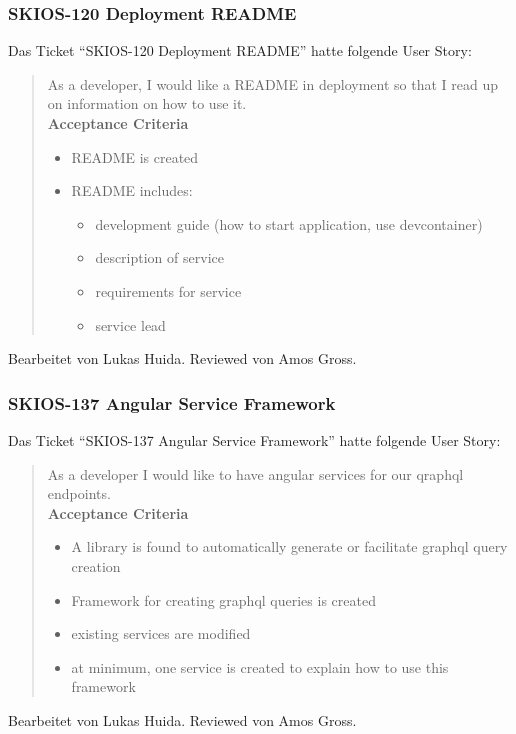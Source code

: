 \subsubsection{SKIOS-120 Deployment README}
Das Ticket \enquote{SKIOS-120 Deployment README} hatte folgende User Story:
\begin{quotation}
    As a developer, I would like a README in deployment so that I read up on information on how to use it. \\
\textbf{Acceptance Criteria}
\begin{itemize}
    \item README is created
    \item README includes:
    \begin{itemize}
        \item development guide (how to start application, use devcontainer)
        \item description of service
        \item requirements for service
        \item service lead
    \end{itemize}
\end{itemize}
\end{quotation}
Bearbeitet von Lukas Huida.
Reviewed von Amos Gross.

\subsubsection{SKIOS-137 Angular Service Framework}
Das Ticket \enquote{SKIOS-137 Angular Service Framework} hatte folgende User Story:
\begin{quotation}
    As a developer I would like to have angular services for our qraphql endpoints. \\
\textbf{Acceptance Criteria}
\begin{itemize}
    \item A library is found to automatically generate or facilitate graphql query creation
    \item Framework for creating graphql queries is created
    \item existing services are modified
    \item at minimum, one service is created to explain how to use this framework
\end{itemize}
\end{quotation}
Bearbeitet von Lukas Huida.
Reviewed von Amos Gross.

